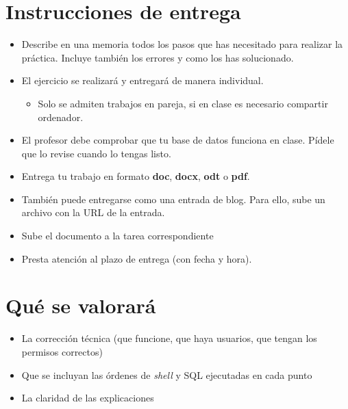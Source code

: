 \section{Instrucciones de entrega}
\begin{itemize}
\item Describe en una memoria todos los pasos que has necesitado para realizar la práctica. Incluye también los errores y como los has solucionado.
\item El ejercicio se realizará y entregará de manera individual.
  \begin{itemize}
  \item Solo se admiten trabajos en pareja, si en clase es necesario compartir ordenador.
  \end{itemize}
\item El profesor debe comprobar que tu base de datos funciona en clase. Pídele que lo revise cuando lo tengas listo.
\item Entrega tu trabajo en formato \textbf{doc}, \textbf{docx}, \textbf{odt} o \textbf{pdf}.
\item También puede entregarse como una entrada de blog. Para ello, sube un archivo con la URL de la entrada.
\item Sube el documento a la tarea correspondiente 
\item Presta atención al plazo de entrega (con fecha y hora).
\end{itemize}


\section{Qué se valorará}
\begin{itemize}
\item La corrección técnica (que funcione, que haya usuarios, que tengan los permisos correctos)
\item Que se incluyan las órdenes de \textit{shell} y SQL ejecutadas en cada punto
\item La claridad de las explicaciones
\end{itemize}




